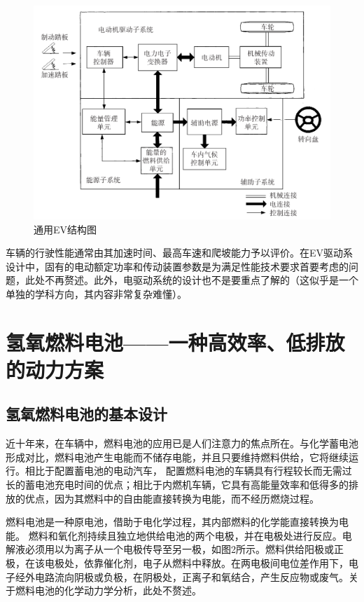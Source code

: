 \documentclass[UTF8,a4paper,11pt]{article}
\begin{document}
\begin{figure}[htbp]
\centering
\includegraphics[scale=0.6]{p1.png}
\caption{通用EV结构图}
\end{figure}

车辆的行驶性能通常由其加速时间、最高车速和爬坡能力予以评价。在EV驱动系设计中，固有的电动额定功率和传动装置参数是为满足性能技术要求首要考虑的问题，此处不再赘述。此外，电驱动系统的设计也不是要重点了解的（这似乎是一个单独的学科方向，其内容非常复杂难懂）。

\section{氢氧燃料电池——一种高效率、低排放的动力方案}
\subsection{氢氧燃料电池的基本设计}
近十年来，在车辆中，燃料电池的应用已是人们注意力的焦点所在。与化学蓄电池形成对比，燃料电池产生电能而不储存电能，并且只要维持燃料供给，它将继续运行。相比于配置蓄电池的电动汽车， 配置燃料电池的车辆具有行程较长而无需过长的蓄电池充电时间的优点；相比于内燃机车辆，它具有高能量效率和低得多的排放的优点，因为其燃料中的自由能直接转换为电能，而不经历燃烧过程。

燃料电池是一种原电池，借助于电化学过程，其内部燃料的化学能直接转换为电能。 燃料和氧化剂持续且独立地供给电池的两个电极，并在电极处进行反应。电解液必须用以为离子从一个电极传导至另一极，如图2所示。燃料供给阳极或正极，在该电极处，依靠催化剂，电子从燃料中释放。在两电极间电位差作用下，电子经外电路流向阴极或负极，在阴极处，正离子和氧结合，产生反应物或废气。关于燃料电池的化学动力学分析，此处不赘述。
\end{document}
